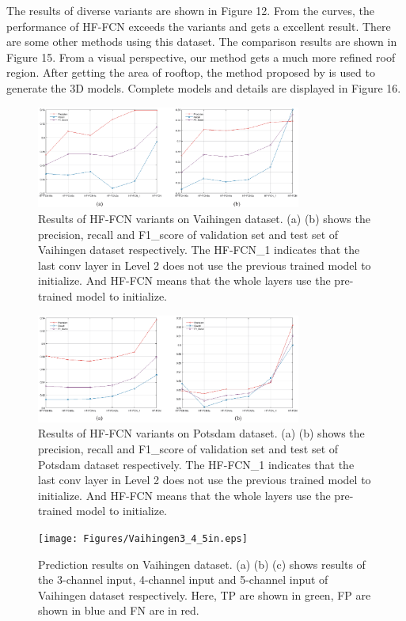 \setlength{\parindent}{2ex}The results of diverse variants are shown in Figure 12. From the curves, the performance of HF-FCN exceeds the variants and gets a excellent result. There are some other methods using this dataset. The comparison results are shown in Figure 15. From a visual perspective, our method gets a much more refined roof region. After getting the area of rooftop, the method proposed by \cite{IEEEexample:zhou20112} is used to generate the 3D models. Complete models and details are displayed in Figure 16.

\begin{figure}
\centering
\includegraphics[width=8.7cm]{Figures/vaihingen_variants.eps}
\caption{Results of HF-FCN variants on Vaihingen dataset. (a) (b) shows the precision, recall and F1\_score of validation set and test set of Vaihingen dataset respectively. The HF-FCN\_1 indicates that the last conv layer in Level 2 does not use the previous trained model to initialize. And HF-FCN means that the whole layers use the pre-trained model to initialize. }
\label{12}
\end{figure}

\begin{figure}
\centering
\includegraphics[width=8.7cm]{Figures/Potsdam_variants.eps}
\caption{Results of HF-FCN variants on Potsdam dataset. (a) (b) shows the precision, recall and F1\_score of validation set and test set of Potsdam dataset respectively. The HF-FCN\_1 indicates that the last conv layer in Level 2 does not use the previous trained model to initialize. And HF-FCN means that the whole layers use the pre-trained model to initialize.}
\label{13}
\end{figure}

\begin{figure}
\centering
\texttt{[image: Figures/Vaihingen3\_4\_5in.eps]}
\caption{Prediction results on Vaihingen dataset. (a) (b) (c) shows results of the 3-channel input, 4-channel input and 5-channel input of Vaihingen dataset respectively. Here, TP are shown in green, FP are shown in blue and FN are in red.}
\label{14}
\end{figure}


